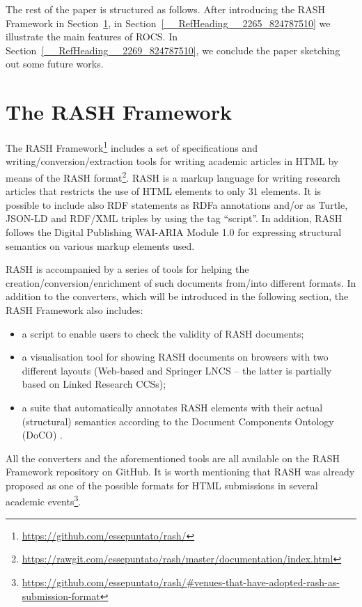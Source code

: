 \documentclass{sig-alternate}
\begin{document}
The rest of the paper is structured as follows. After introducing the RASH Framework in Section~\ref{__RefHeading__2267_824787510}, in Section~\ref{__RefHeading__2265_824787510} we illustrate the main features of ROCS. In Section~\ref{__RefHeading__2269_824787510}, we conclude the paper sketching out some future works.

\section{The RASH Framework}\label{__RefHeading__2267_824787510}

The RASH Framework\footnote{\url{https://github.com/essepuntato/rash/}} includes a set of specifications and writing/conversion/extraction tools for writing academic articles in HTML by means of the RASH format\footnote{\url{https://rawgit.com/essepuntato/rash/master/documentation/index.html}}. RASH is a markup language for writing research articles that restricts the use of HTML elements to only 31 elements. It is possible to include also RDF statements as RDFa annotations and/or as Turtle, JSON-LD and RDF/XML triples by using the tag ``script''. In addition, RASH follows the Digital Publishing WAI-ARIA Module 1.0  \cite{__RefNumPara__2338_824787510} for expressing structural semantics on various markup elements used.

RASH is accompanied by a series of tools for helping the creation/conversion/enrichment of such documents from/into different formats. In addition to the converters, which will be introduced in the following section, the RASH Framework also includes: 
\begin{itemize}
\item a script to enable users to check the validity of RASH documents;
\item a visualisation tool for showing RASH documents on browsers with two different layouts (Web-based and Springer LNCS -- the latter is partially based on Linked Research  \cite{__RefNumPara__2437_824787510} CCSs);
\item a suite that automatically annotates RASH elements with their actual (structural) semantics according to the Document Components Ontology (DoCO)  \cite{__RefNumPara__2517_824787510}.
\end{itemize}

All the converters and the aforementioned tools are all available on the RASH Framework repository on GitHub. It is worth mentioning that RASH was already proposed as one of the possible formats for HTML submissions in several academic events\footnote{\url{https://github.com/essepuntato/rash/\#venues-that-have-adopted-rash-as-submission-format}}.
\end{document}
